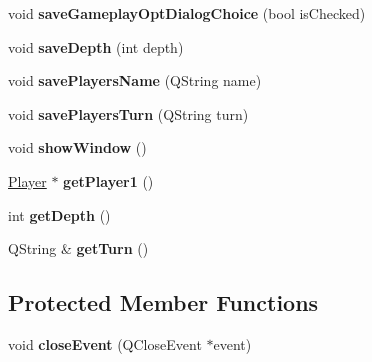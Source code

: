 \begin{DoxyCompactItemize}
\item 
\hypertarget{classMainWindow_a23e9954cae4168a197ea39c25fbec3a5}{
void {\bfseries saveGameplayOptDialogChoice} (bool isChecked)}
\label{classMainWindow_a23e9954cae4168a197ea39c25fbec3a5}

\item 
\hypertarget{classMainWindow_a49a4f69409d0cf14889f7ebb70117ca6}{
void {\bfseries saveDepth} (int depth)}
\label{classMainWindow_a49a4f69409d0cf14889f7ebb70117ca6}

\item 
\hypertarget{classMainWindow_a934fad64314f4487dc3f8542e8645957}{
void {\bfseries savePlayersName} (QString name)}
\label{classMainWindow_a934fad64314f4487dc3f8542e8645957}

\item 
\hypertarget{classMainWindow_a5f7f75e9c1d536e677f1d208dc2d8cb8}{
void {\bfseries savePlayersTurn} (QString turn)}
\label{classMainWindow_a5f7f75e9c1d536e677f1d208dc2d8cb8}

\item 
\hypertarget{classMainWindow_a04d901dec193f723d5ab3c4a3231b6b8}{
void {\bfseries showWindow} ()}
\label{classMainWindow_a04d901dec193f723d5ab3c4a3231b6b8}

\item 
\hypertarget{classMainWindow_a0e505f92472647448b476eb1d196c654}{
\hyperlink{classPlayer}{Player} $\ast$ {\bfseries getPlayer1} ()}
\label{classMainWindow_a0e505f92472647448b476eb1d196c654}

\item 
\hypertarget{classMainWindow_aa3d777d93286f09397535b9adc26a2bb}{
int {\bfseries getDepth} ()}
\label{classMainWindow_aa3d777d93286f09397535b9adc26a2bb}

\item 
\hypertarget{classMainWindow_a54a9a1e9bbc65767a18856273f032578}{
QString \& {\bfseries getTurn} ()}
\label{classMainWindow_a54a9a1e9bbc65767a18856273f032578}

\end{DoxyCompactItemize}
\subsection*{Protected Member Functions}
\begin{DoxyCompactItemize}
\item 
\hypertarget{classMainWindow_a4e20a4a065fbb0e4d3532a45a0a91425}{
void {\bfseries closeEvent} (QCloseEvent $\ast$event)}
\label{classMainWindow_a4e20a4a065fbb0e4d3532a45a0a91425}

\end{DoxyCompactItemize}


